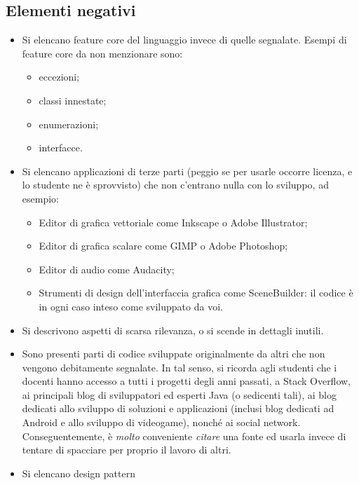 \subsection*{Elementi negativi}
\begin{itemize}
	\item Si elencano feature core del linguaggio invece di quelle segnalate. Esempi di feature
	core da non menzionare sono:
	\begin{itemize}
		\item eccezioni;
		\item classi innestate;
		\item enumerazioni;
		\item interfacce.
	\end{itemize}
	\item Si elencano applicazioni di terze parti (peggio se per usarle occorre licenza, e lo
	studente ne è sprovvisto) che non c'entrano nulla con lo sviluppo, ad esempio:
	\begin{itemize}
		\item Editor di grafica vettoriale come Inkscape o Adobe Illustrator;
		\item Editor di grafica scalare come GIMP o Adobe Photoshop;
		\item Editor di audio come Audacity;
		\item Strumenti di design dell'interfaccia grafica come SceneBuilder: il codice è in ogni caso inteso come sviluppato da voi.
	\end{itemize}
	\item Si descrivono aspetti di scarsa rilevanza, o si scende in dettagli inutili.
	\item Sono presenti parti di codice sviluppate originalmente da altri che non vengono
	debitamente segnalate. In tal senso, si ricorda agli studenti che i docenti hanno accesso a tutti i
	progetti degli anni passati, a Stack Overflow, ai principali blog di sviluppatori ed esperti Java (o sedicenti tali), ai blog dedicati allo sviluppo di soluzioni e applicazioni (inclusi blog dedicati ad Android e allo sviluppo di videogame), nonché ai social network. Conseguentemente, è \emph{molto} conveniente \emph{citare} una fonte ed usarla invece di tentare di spacciare per proprio il lavoro di altri.
	\item Si elencano design pattern
\end{itemize}